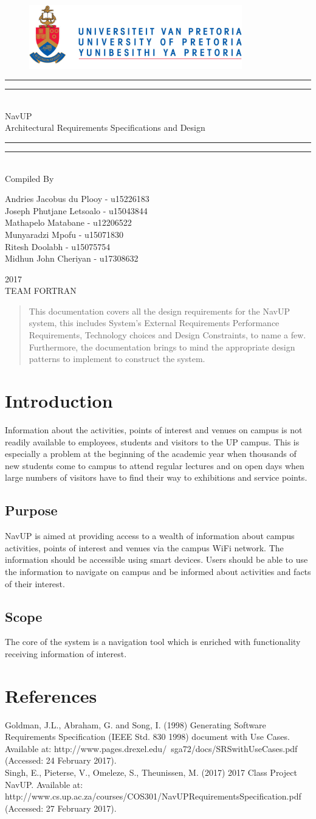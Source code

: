 \documentclass{article}
\newcommand*{\titleGP}{\begingroup
		\begin{figure}[t]
			\centering
			\includegraphics[width=350px]{UP_Logo.PNG}
		\end{figure}
\centering 
\vspace*{\baselineskip}

\rule{\textwidth}{1.6pt}\vspace*{-\baselineskip}\vspace*{2pt}
\rule{\textwidth}{0.4pt}\\[\baselineskip]

{\LARGE NavUP\\ [0.3\baselineskip] Architectural Requirements Specifications and Design } \\ [0.2\baselineskip]
\rule{\textwidth}{0.4pt}\vspace*{-\baselineskip}\vspace{3.2pt}
\rule{\textwidth}{1.6pt}\\[\baselineskip] %



Compiled By \\[\baselineskip]
{\Large Andries Jacobus du Plooy - u15226183 \\ Joseph Phutjane Letsoalo - u15043844 \\ Mathapelo Matabane - u12206522 \\ Munyaradzi Mpofu - u15071830\\ Ritesh Doolabh - u15075754 \\ Midhun John Cheriyan - u17308632\par} 
 

\vfill

{\scshape 2017} \\[0.3\baselineskip]
{\large TEAM FORTRAN}\par

\endgroup}
\begin{document}
\titleGP
\newpage


\begin{abstract}
\noindent This documentation covers all the design requirements for the NavUP system, this includes System's External Requirements Performance Requirements, Technology choices and Design Constraints, to name a few. Furthermore, the documentation brings to mind the appropriate design patterns to implement to construct the system.
\end{abstract}

\newpage
\tableofcontents

\newpage
\section{Introduction}
Information about the activities, points of interest and venues on campus is not
readily available to employees, students and visitors to the UP campus. This is
especially a problem at the beginning of the academic year when thousands of new
students come to campus to attend regular lectures and on open days when large
numbers of visitors have to find their way to exhibitions and service points.

\subsection{Purpose}
NavUP is aimed at providing access to a wealth of information about campus
activities, points of interest and venues via the campus WiFi network. The information
should be accessible using smart devices. Users should be able to use the
information to navigate on campus and be informed about activities and facts of their
interest.
\subsection{Scope}
The core of the system is a navigation tool which is enriched with functionality
receiving information of interest.

\section{References}
Goldman, J.L., Abraham, G. and Song, I. (1998) Generating Software Requirements Specification (IEEE Std. 830 1998) document with Use Cases. Available at: http://www.pages.drexel.edu/~sga72/docs/SRSwithUseCases.pdf (Accessed: 24 February 2017).\\
\noindent Singh, E., Pieterse, V., Omeleze, S., Theunissen, M. (2017) 2017 Class Project NavUP. Available at: http://www.cs.up.ac.za/courses/COS301/NavUPRequirementsSpecification.pdf (Accessed: 27 February 2017).\\ 
\newpage
\end{document}
